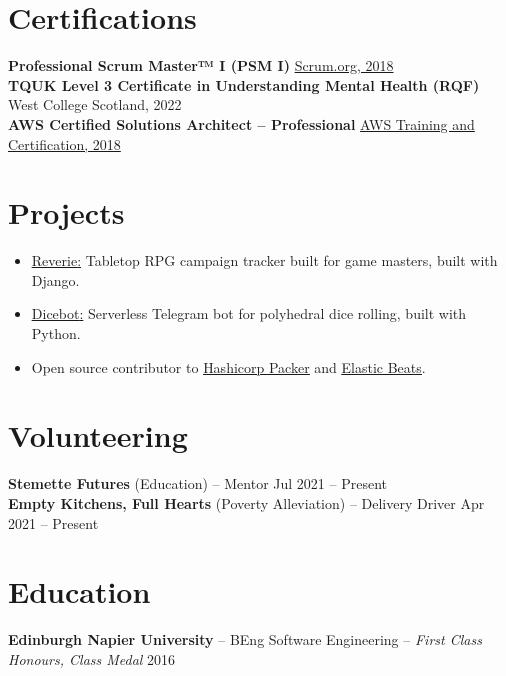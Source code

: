 \documentclass[11pt]{article}       %
\begin{document}
\vspace{-6.5pt}



\section*{Certifications}
\textbf{Professional Scrum Master™ I (PSM I)} \hfill \href{https://www.credly.com/users/devenney}{Scrum.org, 2018} \\
\textbf{TQUK Level 3 Certificate in Understanding Mental Health (RQF)} \hfill West College Scotland, 2022 \\
\textbf{AWS Certified Solutions Architect – Professional} \hfill \href{https://www.credly.com/users/devenney}{AWS Training and Certification, 2018} \\

\vspace{-6.5pt}

\section*{Projects}
\begin{itemize}
  \item \underline{\href{https://github.com/oneirism/reverie}{Reverie}:} Tabletop RPG campaign tracker built for game masters, built with Django.
  \item \underline{\href{https://github.com/oneirism/dicebot}{Dicebot}:} Serverless Telegram bot for polyhedral dice rolling, built with Python.
  \item Open source contributor to \underline{\href{https://github.com/hashicorp/packer}{Hashicorp Packer}} and \underline{\href{https://github.com/elastic/beats}{Elastic Beats}}.
\end{itemize}

\vspace{-18.5pt}

\section*{Volunteering}
\textbf{Stemette Futures} (Education) -- Mentor \hfill Jul 2021 -- Present \\
\textbf{Empty Kitchens, Full Hearts} (Poverty Alleviation) -- Delivery Driver \hfill Apr 2021 -- Present \\

\vspace{-6.5pt}

\section*{Education}
\textbf{Edinburgh Napier University} -- BEng Software Engineering -- \textit{First Class Honours, Class Medal} \hfill 2016 \\
\end{document}
